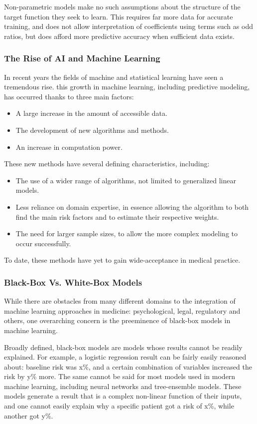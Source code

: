 \documentclass[a4paper,12pt]{article}
\begin{document}
		Non-parametric models make no such assumptions about the structure of the target function they seek to learn. This requires far more data for accurate training, and does not allow interpretation of coefficients using terms such as odd ratios, but does afford more predictive accuracy when sufficient data exists\cite{Russell2002}.
		
		\subsubsection{The Rise of AI and Machine Learning}
		
		In recent years the fields of machine and statistical learning have seen a tremendous rise\cite{Obermeyer2016}. this growth in machine learning, including predictive modeling, has occurred thanks to three main factors\cite{Shalev-Shwartz2014}:
		\begin{itemize}
			\item A large increase in the amount of accessible data.
			\item The development of new algorithms and methods.
			\item An increase in computation power.
		\end{itemize} 
		These new methods have several defining characteristics, including:
		\begin{itemize}
			\item The use of a wider range of algorithms, not limited to generalized linear models.
			\item Less reliance on domain expertise, in essence allowing the algorithm to both find the main risk factors and to estimate their respective weights.
			\item The need for larger sample sizes, to allow the more complex modeling to occur successfully.
		\end{itemize}
		To date, these methods have yet to gain wide-acceptance in medical practice\cite{Obermeyer2016,Deo2015}.
		
		\subsubsection{Black-Box Vs. White-Box Models}
		While there are obstacles from many different domains to the integration of machine learning approaches in medicine: psychological, legal, regulatory and others, one overarching concern is the preeminence of black-box models in machine learning\cite{Price2015}.
		
		Broadly defined, black-box models are models whose results cannot be readily explained. For example, a logistic regression result can be fairly easily reasoned about: baseline risk was x\%, and a certain combination of variables increased the risk by y\% more. The same cannot be said for most models used in modern machine learning, including neural networks and tree-ensemble models. These models generate a result that is a complex non-linear function of their inputs, and one cannot easily explain why a specific patient got a risk of x\%, while another got y\%.
		
\end{document}
